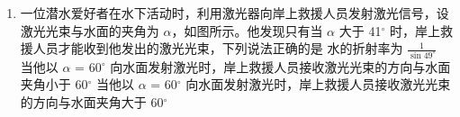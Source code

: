 \documentclass[\gkver]{gaokaozhenti}
\begin{document}
\begin{enumerate}
{再根据  $qvB = m \frac{v^2}{r}$，可知粒子半径变为原来的  $\frac{4}{\sqrt{3}} > 2$，则粒子从 OF 边射出，根据几何关系可知转过的圆心角为  $60^\circ$，根据  $qvB = m \frac{4\pi^2}{T^2} r$，有

 $t = \frac{4\sqrt{3}\pi m}{9qB_2}$

则  $t = \frac{8\sqrt{3}t_0}{9}$

C 错误；

D. 若仅将区域Ⅱ中磁感应强度大小变为  $\frac{\sqrt{2}}{4}B_2$，则粒子在 AC 做直线运动的速度仍为  $v_0$，

再根据  $qvB = m \frac{v^2}{r}$，可知粒子半径变为原来的  $\frac{4}{\sqrt{2}} > 2$，则粒子 OF 边射出，根据几何关系

可知转过的圆心角为  $45^\circ$，根据  $qvB = m \frac{4\pi^2}{T^2} r$，有

 $t = \frac{\sqrt{2}\pi m}{2qB_2}$

则  $t = \sqrt{2}t_0$

D 正确。

故选 D。

}

\item
一位潜水爱好者在水下活动时，利用激光器向岸上救援人员发射激光信号，设激光光束与水面的夹角为 $\alpha$，如图所示。他发现只有当 $\alpha$ 大于 41${^\circ}$ 时，岸上救援人员才能收到他发出的激光光束，下列说法正确的是
{水的折射率为 $\frac{1}{{\sin 49^\circ }}$}
{当他以 $\alpha$ = 60${^\circ}$ 向水面发射激光时，岸上救援人员接收激光光束的方向与水面夹角小于 60${^\circ}$}
{当他以 $\alpha$ = 60${^\circ}$ 向水面发射激光时，岸上救援人员接收激光光束的方向与水面夹角大于 60${^\circ}$}
\end{enumerate}
\end{document}
